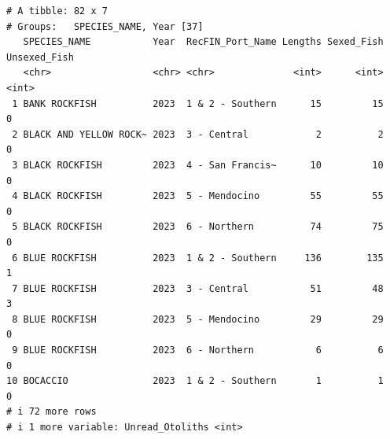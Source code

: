 \documentclass[
  letterpaper,
  DIV=11,
  numbers=noendperiod]{scrartcl}
\begin{document}
\begin{verbatim}
# A tibble: 82 x 7
# Groups:   SPECIES_NAME, Year [37]
   SPECIES_NAME           Year  RecFIN_Port_Name Lengths Sexed_Fish Unsexed_Fish
   <chr>                  <chr> <chr>              <int>      <int>        <int>
 1 BANK ROCKFISH          2023  1 & 2 - Southern      15         15            0
 2 BLACK AND YELLOW ROCK~ 2023  3 - Central            2          2            0
 3 BLACK ROCKFISH         2023  4 - San Francis~      10         10            0
 4 BLACK ROCKFISH         2023  5 - Mendocino         55         55            0
 5 BLACK ROCKFISH         2023  6 - Northern          74         75            0
 6 BLUE ROCKFISH          2023  1 & 2 - Southern     136        135            1
 7 BLUE ROCKFISH          2023  3 - Central           51         48            3
 8 BLUE ROCKFISH          2023  5 - Mendocino         29         29            0
 9 BLUE ROCKFISH          2023  6 - Northern           6          6            0
10 BOCACCIO               2023  1 & 2 - Southern       1          1            0
# i 72 more rows
# i 1 more variable: Unread_Otoliths <int>
\end{verbatim}
\end{document}
